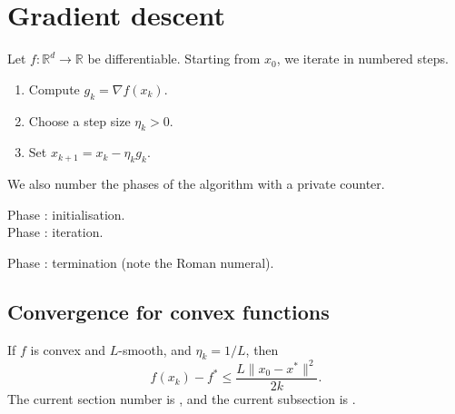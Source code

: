 \documentclass[11pt,letterpaper]{article}
\newcounter{step}
\newcommand{\R}{\mathbb{R}}
\begin{document}
\section{Gradient descent}
Let $f\colon\R^d\to\R$ be differentiable. Starting from $x_0$, we iterate in numbered steps.
\begin{enumerate}
\setcounter{enumi}{0}
\item Compute $g_k=\nabla f(x_k)$.
\item Choose a step size $\eta_k>0$.
\item Set $x_{k+1}=x_k-\eta_k g_k$.
\end{enumerate}
We also number the phases of the algorithm with a private counter.

\noindent Phase : initialisation.\\
\noindent Phase : iteration.\\
\addtocounter{step}{1}\noindent Phase : termination (note the Roman numeral).

\subsection{Convergence for convex functions}
If $f$ is convex and $L$-smooth, and $\eta_k=1/L$, then
\[
f(x_k)-f^\ast\le\frac{L\|x_0-x^\ast\|^2}{2k}.
\]
The current section number is \thesection, and the current subsection is \thesubsection.
\end{document}
